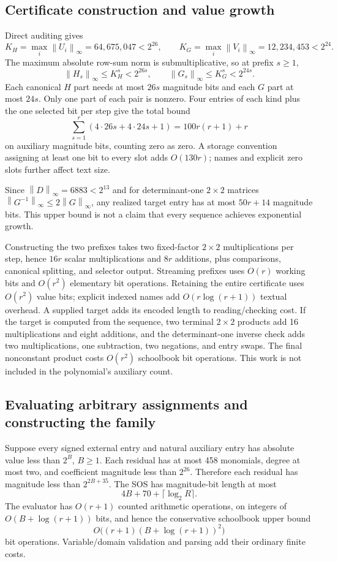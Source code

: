 \documentclass[11pt,letterpaper]{article}
\theoremstyle{definition}
\theoremstyle{remark}
\newcommand{\umnorm}[1]{\left\lVert #1\right\rVert_\infty}
\begin{document}
\subsection{Certificate construction and value growth}
Direct auditing gives
\[
 K_H=\max_i\umnorm{U_i}=64{,}675{,}047<2^{26},\qquad
 K_G=\max_i\umnorm{V_i}=12{,}234{,}453<2^{24}.
\]
The maximum absolute row-sum norm is submultiplicative, so at prefix $s\geq1$,
\[
 \umnorm{H_s}\leq K_H^s<2^{26s},\qquad
 \umnorm{G_s}\leq K_G^s<2^{24s}.
\]
Each canonical $H$ part needs at most $26s$ magnitude bits and each $G$ part at most $24s$. Only one part of each pair is nonzero. Four entries of each kind plus the one selected bit per step give the total bound
\begin{equation}\label{gts:um:eq:certbits}
 \sum_{s=1}^r(4\cdot26s+4\cdot24s+1)
 =100r(r+1)+r
\end{equation}
on auxiliary magnitude bits, counting zero as zero. A storage convention assigning at least one bit to every slot adds $O(130r)$; names and explicit zero slots further affect text size.

Since $\umnorm D=6883<2^{13}$ and for determinant-one $2\times2$ matrices
$\umnorm{G^{-1}}\leq2\umnorm G$, any realized target entry has at most $50r+14$ magnitude bits. This upper bound is not a claim that every sequence achieves exponential growth.

Constructing the two prefixes takes two fixed-factor $2\times2$ multiplications per step, hence $16r$ scalar multiplications and $8r$ additions, plus comparisons, canonical splitting, and selector output. Streaming prefixes uses $O(r)$ working bits and $O(r^2)$ elementary bit operations. Retaining the entire certificate uses $O(r^2)$ value bits; explicit indexed names add $O(r\log(r+1))$ textual overhead. A supplied target adds its encoded length to reading/checking cost. If the target is computed from the sequence, two terminal $2\times2$ products add 16 multiplications and eight additions, and the determinant-one inverse check adds two multiplications, one subtraction, two negations, and entry swaps. The final nonconstant product costs $O(r^2)$ schoolbook bit operations. This work is not included in the polynomial's auxiliary count.

\subsection{Evaluating arbitrary assignments and constructing the family}
Suppose every signed external entry and natural auxiliary entry has absolute value less than $2^B$, $B\geq1$. Each residual has at most 458 monomials, degree at most two, and coefficient magnitude less than $2^{26}$. Therefore each residual has magnitude less than $2^{2B+35}$. The SOS has magnitude-bit length at most
\[
 4B+70+\lceil\log_2R\rceil.
\]
The evaluator has $O(r+1)$ counted arithmetic operations, on integers of $O(B+\log(r+1))$ bits, and hence the conservative schoolbook upper bound
\[
 O\bigl((r+1)(B+\log(r+1))^2\bigr)
\]
bit operations. Variable/domain validation and parsing add their ordinary finite costs.
\end{document}
